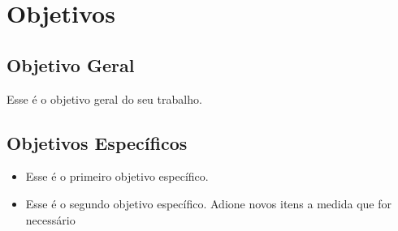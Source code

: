 \chapter{Objetivos}

\section{Objetivo Geral}

Esse é o objetivo geral do seu trabalho.

\section{Objetivos Específicos}

\begin{itemize}
    \item Esse é o primeiro objetivo específico.
    \item Esse é o segundo objetivo específico. Adione novos itens a medida que for necessário
\end{itemize}